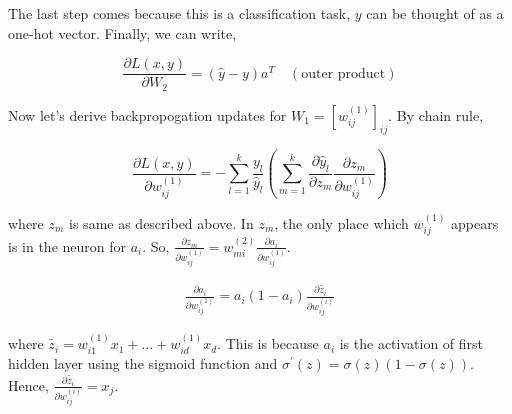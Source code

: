 \documentclass[a4paper]{article}
\theoremstyle{definition}
\newenvironment{soln}{
    \leavevmode\color{blue}\ignorespaces
}{}
\begin{document}
\begin{enumerate}
\begin{soln}
    The last step comes because this is a classification task, $y$ can be thought of as a one-hot vector. Finally, we can write,

    \begin{equation*}
        \frac{\partial L(x, y)}{\partial W_2} = (\hat{y} - y) a^{T} \quad (\text{outer product})
    \end{equation*}
    
    Now let's derive backpropogation updates for $W_1 = \left[ w_{ij}^{(1)} \right]_{ij}$. By chain rule,

    \begin{equation*}
        \frac{\partial L(x, y)}{\partial w_{ij}^{(1)}} = - \sum\limits_{l = 1}^{k} \frac{y_l}{\hat{y}_l} \left( \sum\limits_{m = 1}^{k} \frac{\partial \hat{y}_l}{\partial z_m} \frac{\partial z_m}{\partial w_{ij}^{(1)}} \right)
    \end{equation*}

    where $z_m$ is same as described above. In $z_m$, the only place which $w_{ij}^{(1)}$ appears is in the neuron for $a_i$. So, $\frac{\partial z_m}{\partial w_{ij}^{(1)}} = w_{mi}^{(2)} \frac{\partial a_i}{\partial w_{ij}^{(1)}}$.

    \begin{align*}
        \frac{\partial a_i}{\partial w_{ij}^{(1)}} = a_i(1 - a_i) \frac{\partial \tilde{z_i}}{\partial w_{ij}^{(i)}}
    \end{align*}

    where $\tilde{z_i} = w_{i1}^{(1)}x_1 + \ldots + w_{i d}^{(1)} x_d$. This is because $a_i$ is the activation of first hidden layer using the sigmoid function and $\sigma^\prime(z) = \sigma(z)(1 - \sigma(z))$. Hence, $\frac{\partial \tilde{z_i}}{\partial w_{ij}^{(i)}} = x_j$.


\end{soln}
\end{enumerate}
\end{document}
